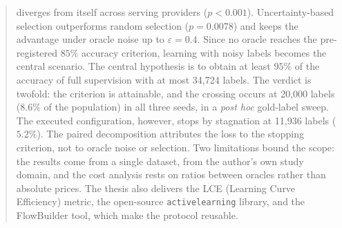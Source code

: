 \begin{abstract}
diverges from itself across serving providers ($p<0.001$). Uncertainty-based
selection outperforms random selection ($p=0.0078$) and keeps the advantage
under oracle noise up to $\varepsilon=0.4$. Since no oracle reaches the
pre-registered $85\%$ accuracy criterion, learning with noisy labels becomes
the central scenario. The central hypothesis is to obtain at least $95\%$ of
the accuracy of full supervision with at most 34,724 labels. The verdict is
twofold: the criterion is attainable, and the crossing occurs at 20,000
labels ($8.6\%$ of the population) in all three seeds, in a \textit{post hoc}
gold-label sweep. The executed configuration, however, stops by stagnation at
11,936 labels ($5.2\%$). The paired decomposition attributes the loss to the
stopping criterion, not to oracle noise or selection. Two limitations bound
the scope: the results come from a single dataset, from the author's own
study domain, and the cost analysis rests on ratios between oracles rather
than absolute prices. The thesis also delivers the LCE (Learning Curve
Efficiency) metric, the open-source \texttt{activelearning} library, and the
FlowBuilder tool, which make the protocol reusable.

\end{abstract}
